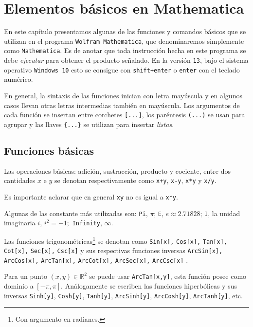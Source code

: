 \chapter{Elementos básicos en Mathematica}

En este capítulo presentamos algunas de las funciones y comandos
básicos que se utilizan en el programa \verb"Wolfram Mathematica", que denominaremos simplemente
como \verb"Mathematica". Es de anotar que toda instrucción hecha en este programa se debe \emph{ejecutar} para obtener el producto señalado. En la versión \verb"13", bajo el sistema operativo \verb"Windows 10" esto se consigue con \verb"shift+enter" o \verb"enter" con el teclado numérico.

En general, la sintaxis de las funciones inician con letra mayúscula
y en algunos casos llevan otras letras intermedias también en mayúscula. Los argumentos de cada función se insertan entre
corchetes \verb"[...]", los paréntesis \verb"(...)" se usan para agrupar y las llaves \verb"{...}" se utilizan para insertar \emph{listas}.

\section{Funciones básicas}
Las operaciones básicas: adición, sustracción, producto y cociente, entre dos cantidades $x$ e $y$ se denotan respectivamente como \verb"x+y", \verb"x-y", \verb"x*y" y \verb"x/y".

\begin{tcolorbox}[title=Advertencia]
  Es importante aclarar que en general \verb"xy" no es igual a \verb"x*y".
\end{tcolorbox}
Algunas de las constante más utilizadas son: \verb"Pi", $\pi$; \verb"E", $e \approx 2.71828$;
\verb"I", la unidad imaginaria $i$, $i^{2}= -1;$ \verb"Infinity", $\infty$.

Las funciones trigonométricas\footnote{Con argumento en radianes.} se denotan como
{\small
  \verb"Sin[x]," \verb"Cos[x]," \verb"Tan[x]," \verb"Cot[x],"
  \verb"Sec[x]," \verb"Csc[x]"
}
y sus respectivas funciones inversas
{\small
  \verb"ArcSin[x]," \verb"ArcCos[x],"
  \verb"ArcTan[x]," \verb"ArcCot[x],"
  \verb"ArcSec[x]," \verb"ArcCsc[x]"
}.

Para un punto $(x,y) \in \mathbb{R}^2$ se puede usar  \verb"ArcTan[x,y]", esta función posee como dominio a $[-\pi,\pi]$.
Análogamente se escriben las funciones hiperbólicas y sus inversas \verb"Sinh[y]",  \verb"Cosh[y]", \verb"Tanh[y]", \verb"ArcSinh[y]", \verb"ArcCosh[y]", \verb"ArcTanh[y]", etc.

